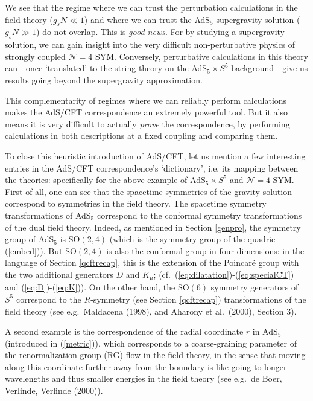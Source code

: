 \documentclass[12pt]{article}
\renewcommand{\^}[1]{\hat{#1}}
\newcommand{\eq}[1]{(\ref{#1})}
\begin{document}
We see that the regime where we can trust the perturbation calculations in the field theory ($g_s N\ll 1$) and where we can trust the AdS$_5$ supergravity solution ($g_s N\gg 1$) do not overlap. This is {\em good news}. For by studying a supergravity solution, we can gain insight into the very difficult non-perturbative physics of strongly coupled $\mathcal{N}=4$ SYM. Conversely, perturbative calculations in this theory can---once `translated' to the string theory on the AdS$_5\times S^5$ background---give us results going beyond the supergravity approximation. 

This complementarity of regimes where we can reliably perform calculations makes the AdS/CFT correspondence an extremely powerful tool. But it also means it is very difficult to actually \emph{prove} the correspondence, by performing calculations in both descriptions at a fixed coupling and comparing them.

To close this heuristic introduction of AdS/CFT, let us mention a few interesting entries in the AdS/CFT correspondence's `dictionary', i.e. its mapping between the theories: specifically for the above example of AdS$_5\times S^5$ and $\mathcal{N}=4$ SYM. First of all, one can see that the spacetime symmetries of the gravity solution correspond to symmetries in the field theory. The spacetime symmetry transformations of AdS$_5$ correspond to the conformal symmetry transformations of the dual field theory. Indeed, as mentioned in Section \ref{genpro}, the symmetry group of AdS$_5$ is $\mbox{SO}(2,4)$ (which is the symmetry group of the quadric \eq{embed}). But $\mbox{SO}(2,4)$ is also the conformal group in four dimensions: in the language of Section \ref{qcftrecap}, this is the extension of the Poincar\'e group with the two additional generators $D$ and $K_{\mu}$; (cf.~\eq{eq:dilatation}-\eq{eq:specialCT} and \eq{eq:D}-\eq{eq:K}). On the other hand, the $\mbox{SO}(6)$ symmetry generators of $S^5$ correspond to the $R$-symmetry (see Section \ref{qcftrecap}) transformations of the field theory (see e.g.~Maldacena (1998), and Aharony et al.~(2000), Section 3). 

A second example is the correspondence of the radial coordinate $r$ in AdS$_5$ (introduced in \eq{metric}), which corresponds to a coarse-graining parameter of the renormalization group (RG) flow in the field theory, in the sense that moving along this coordinate further away from the boundary is like going to longer wavelengths and thus smaller energies in the field theory (see e.g.~de Boer, Verlinde, Verlinde (2000)). 
\end{document}
